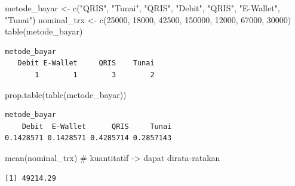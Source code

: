 \documentclass[
  indonesian,
  letterpaper,
]{book}
\newenvironment{Shaded}{\begin{snugshade}}{\end{snugshade}}
\newcommand{\CommentTok}[1]{\textcolor[rgb]{0.37,0.37,0.37}{#1}}
\newcommand{\DecValTok}[1]{\textcolor[rgb]{0.68,0.00,0.00}{#1}}
\newcommand{\FunctionTok}[1]{\textcolor[rgb]{0.28,0.35,0.67}{#1}}
\newcommand{\NormalTok}[1]{\textcolor[rgb]{0.00,0.23,0.31}{#1}}
\newcommand{\OtherTok}[1]{\textcolor[rgb]{0.00,0.23,0.31}{#1}}
\newcommand{\StringTok}[1]{\textcolor[rgb]{0.13,0.47,0.30}{#1}}
\begin{document}
\begin{Shaded}
\begin{Highlighting}[]
\NormalTok{metode\_bayar }\OtherTok{\textless{}{-}} \FunctionTok{c}\NormalTok{(}\StringTok{"QRIS"}\NormalTok{, }\StringTok{"Tunai"}\NormalTok{, }\StringTok{"QRIS"}\NormalTok{, }\StringTok{"Debit"}\NormalTok{, }\StringTok{"QRIS"}\NormalTok{, }\StringTok{"E{-}Wallet"}\NormalTok{, }\StringTok{"Tunai"}\NormalTok{)}
\NormalTok{nominal\_trx }\OtherTok{\textless{}{-}} \FunctionTok{c}\NormalTok{(}\DecValTok{25000}\NormalTok{, }\DecValTok{18000}\NormalTok{, }\DecValTok{42500}\NormalTok{, }\DecValTok{150000}\NormalTok{, }\DecValTok{12000}\NormalTok{, }\DecValTok{67000}\NormalTok{, }\DecValTok{30000}\NormalTok{)}
\FunctionTok{table}\NormalTok{(metode\_bayar)}
\end{Highlighting}
\end{Shaded}

\begin{verbatim}
metode_bayar
   Debit E-Wallet     QRIS    Tunai 
       1        1        3        2 
\end{verbatim}

\begin{Shaded}
\begin{Highlighting}[]
\FunctionTok{prop.table}\NormalTok{(}\FunctionTok{table}\NormalTok{(metode\_bayar))}
\end{Highlighting}
\end{Shaded}

\begin{verbatim}
metode_bayar
    Debit  E-Wallet      QRIS     Tunai 
0.1428571 0.1428571 0.4285714 0.2857143 
\end{verbatim}

\begin{Shaded}
\begin{Highlighting}[]
\FunctionTok{mean}\NormalTok{(nominal\_trx) }\CommentTok{\# kuantitatif {-}\textgreater{} dapat dirata{-}ratakan}
\end{Highlighting}
\end{Shaded}

\begin{verbatim}
[1] 49214.29
\end{verbatim}
\end{document}
